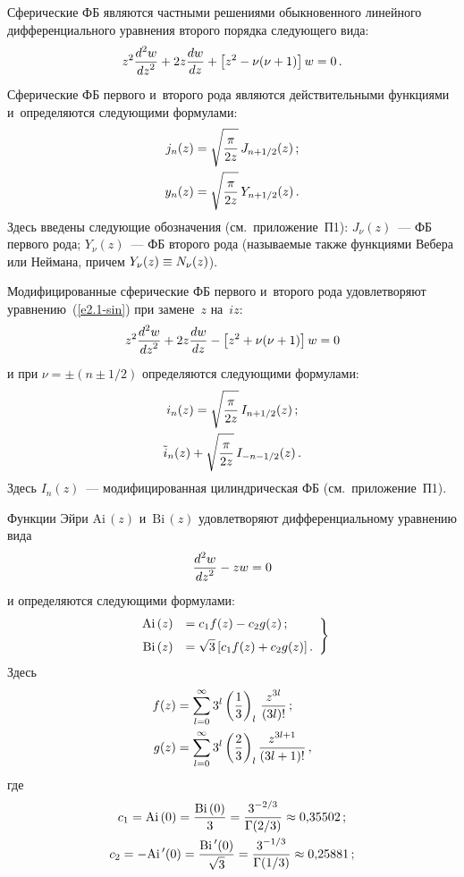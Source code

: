 \begin{multicols}{2}
Сферические ФБ являются частными решениями обыкновенного линейного дифференциального 
уравнения второго порядка следующего вида:
\begin{equation}
    z^2 \displaystyle\frac{\displaystyle d^2w\mathstrut}{\displaystyle dz^2\mathstrut} + 2 z \displaystyle\frac{\displaystyle dw\mathstrut}{\displaystyle dz\mathstrut} + 
    \left[ z^2 -\nu (\nu+1)\right] w =0\,.\label{e2.1-sin}
    \end{equation}
Сферические ФБ первого и~второго рода являются действительными функциями и~определяются 
следующими формулами:
\begin{align*}
j_n (z) &= \sqrt{\fr{\pi}{2z}} \,J_{n+1/2} (z)\,;%
\\
y_n (z) &= \sqrt{\fr{\pi}{2z}}\, Y_{n+1/2} (z)\,. %
\end{align*}
Здесь введены следующие обозначения (см.\ приложение~П1): 
$J_\nu (z)$~--- ФБ первого рода;  $Y_\nu (z)$~--- 
ФБ второго рода (называемые также функциями Вебера или Неймана, 
причем $Y_\nu (z)\hm \equiv N_\nu (z)$).

Модифицированные сферические ФБ первого и~второго рода удовлетворяют
уравнению~(\ref{e2.1-sin}) при замене~$z$ на~$iz$:
    \begin{equation*}
    z^2 \fr{d^2 w}{dz^2} + 2 z \fr{dw}{dz} -
    \lk z^2 +\nu(\nu+1)\rk w =0 %
    \end{equation*}
и при $\nu =\pm (n\pm 1/2)$ определяются следующими формулами:
\begin{gather*}
i_n (z) = \sqrt{\fr{\pi}{ 2z}}\, I_{n+1/2} (z)\,; %
\\
\tilde i_n (z) + \sqrt{\fr{\pi}{2z}}\, I_{-n-1/2} (z)\,. %
\end{gather*}
Здесь $I_n (z)$~--- модифицированная цилиндрическая ФБ (см.\ приложение~П1).

Функции Эйри  $\mathrm{Ai}\,(z)$  и~$\mathrm{Bi}\,(z)$ удовлетворяют 
дифференциальному уравнению вида
\begin{equation*}
\displaystyle\frac{\displaystyle d^2 w\mathstrut}{\displaystyle dz^2\mathstrut} - z w =0 
\end{equation*}
и определяются следующими формулами:
\begin{equation}
\left.
\begin{array}{rl}
\mathrm{Ai}\, (z) &= c_1 f(z) - c_2 g(z)\,;\\[6pt]
\mathrm{Bi}\,(z) &= \displaystyle\sqrt{3} \left[ c_1 f(z) + c_2 g(z)\right].
\end{array}
\right\}
\label{e2.8-sin}
\end{equation}
Здесь
\begin{align*}
    f(z) &= \displaystyle\sum\limits_{l=0}^\infty 3^l \left(\displaystyle\frac{\displaystyle 1\mathstrut}{\displaystyle 3\mathstrut}\right)_l \,
    \displaystyle\frac{\displaystyle z^{3l}\mathstrut}{\displaystyle (3l)!\mathstrut}\,;\\
    g(z) &= \displaystyle\sum\limits_{l=0}^\infty 3^l \left(\displaystyle\frac{\displaystyle 2\mathstrut}{\displaystyle 3\mathstrut}\right)_l \displaystyle\frac{\displaystyle z^{3l+1}\mathstrut}{\displaystyle (3l+1)!\mathstrut}\,,
    \end{align*}
где
\begin{gather*}
c_1 = \mathrm{Ai}\, (0) =\displaystyle\frac{\displaystyle \mathrm{Bi}\,(0)\mathstrut}{\displaystyle 3\mathstrut} =
    \displaystyle\frac{\displaystyle 3^{-2/3}\mathstrut}{\displaystyle \Gamma (2/3)\mathstrut} \approx 0{,}35502\,;\\ 
    c_2 = -\mathrm{Ai}\,' (0) = \displaystyle\frac{\displaystyle \mathrm{Bi}\,'(0) \mathstrut}{\displaystyle \sqrt{3}\mathstrut} =
    \displaystyle\frac{\displaystyle 3^{-1/3}\mathstrut}{\displaystyle \Gamma (1/3)\mathstrut} \approx 0{,}25881\,;
\end{gather*}


\end{multicols}
